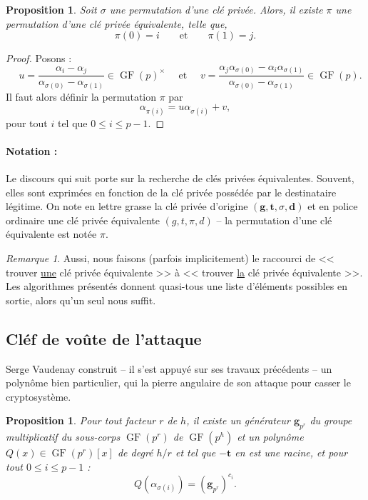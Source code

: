 \documentclass[a4paper, titlepage, 11pt]{article}
\newtheorem{prop}[theo]{Proposition}
\theoremstyle{definition}
\theoremstyle{remark}
\newtheorem{rema}[theo]{Remarque}
\def\gf{\operatorname{GF}}
\def\mbf#1{\mathbf{#1}}
\begin{document}
\begin{prop}\label{prop:permutation}
Soit $\sigma$ une permutation d'une clé privée. Alors, il existe $\pi$ une permutation d'une clé privée équivalente, telle que, $$\pi(0) = i \qquad \text{et}\qquad \pi(1) = j.$$
\end{prop}

\begin{proof}
Posons :
$$\quad u = \frac{\alpha_i - \alpha_j}{\alpha_{\sigma(0)}- \alpha_{\sigma(1)}} \in \gf(p)^\times \quad \text{ et } \quad v =  \frac{\alpha_j\alpha_{\sigma(0)} - \alpha_i\alpha_{\sigma(1)}}{\alpha_{\sigma(0)}- \alpha_{\sigma(1)}} \in \gf(p).$$
Il faut alors définir la permutation $\pi$ par
 $$\alpha_{\pi(i)} = u\alpha_{\sigma(i)} + v,$$
 pour tout $i$ tel que $0 \leqslant i \leqslant p-1$.
\end{proof}

\paragraph*{Notation :} Le discours qui suit porte sur la recherche de clés privées équivalentes. Souvent, elles sont exprimées en fonction de la clé privée possédée par le destinataire légitime. On note en lettre grasse la clé privée d'origine $(\mbf{g}, \mbf{t}, \sigma, \mbf{d})$ et en police ordinaire une clé privée équivalente $(g, t, \pi, d)$ -- la permutation d'une clé équivalente est notée $\pi$.

\begin{rema}
Aussi, nous faisons (parfois implicitement) le raccourci de << trouver \underline{une} clé privée équivalente >> à << trouver \underline{la} clé privée équivalente >>. Les algorithmes présentés donnent quasi-tous une liste d'éléments possibles en sortie, alors qu'un seul nous suffit.
\end{rema}

\subsection*{Cléf de voûte de l'attaque}

Serge Vaudenay construit -- il s'est appuyé sur ses travaux précédents -- un polynôme bien particulier, qui la pierre angulaire de son attaque pour casser le cryptosystème.

\begin{prop}\label{premierePropVaudenay}
Pour tout facteur $r$ de $h$, il existe un générateur $\mbf g_{p^r}$ du groupe multiplicatif du sous-corps $\gf(p^r)$ de $\gf(p^h)$ et un polynôme $Q(x) \in \gf(p^r)[x]$ de degré $h/r$ et tel que $-\mbf t$ en est une racine, et pour tout $0\leqslant i \leqslant p-1$ :
$$Q\left(\alpha_{\sigma(i)}\right) = (\mbf g_{p^r})^{c_i}.$$
\end{prop}
\end{document}
